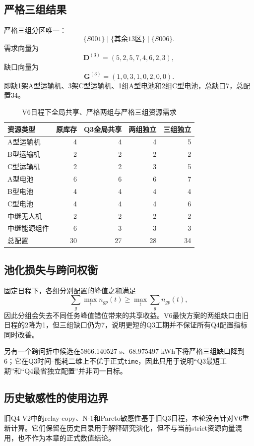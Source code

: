 \documentclass[UTF8,a4paper,12pt]{ctexart}
\begin{document}
\subsection{严格三组结果}

严格三组分区唯一：
\[
\boxed{\{S001\}\mid\{\text{其余13区}\}\mid\{S006\}}.
\]
需求向量为
\[
\mathbf D^{(3)}=(5,2,5,7,4,6,2,3),
\]
缺口向量为
\[
\boxed{\mathbf G^{(3)}=(1,0,3,1,0,2,0,0)}.
\]
即缺1架A型运输机、3架C型运输机、1组A型电池和2组C型电池，总缺口7，总配置34。

\begin{table}[H]
\centering
\caption{V6日程下全局共享、严格两组与严格三组资源需求}
\begin{tabular}{lrrrr}
\toprule
资源类型 & 原库存 & Q3全局共享 & 两组独立 & 三组独立\\
\midrule
A型运输机 & 4 & 4 & 4 & 5\\
B型运输机 & 2 & 2 & 2 & 2\\
C型运输机 & 2 & 2 & 3 & 5\\
A型电池 & 6 & 6 & 6 & 7\\
B型电池 & 4 & 4 & 4 & 4\\
C型电池 & 4 & 4 & 4 & 6\\
中继无人机 & 2 & 2 & 2 & 2\\
中继能源组件 & 6 & 3 & 3 & 3\\
\midrule
总配置 & 30 & 27 & 28 & 34\\
\bottomrule
\end{tabular}
\end{table}

\subsection{池化损失与跨问权衡}

固定日程下，各组分别配置的峰值之和满足
\[
\sum_g\max_t n_{gp}(t)\ge \max_t\sum_g n_{gp}(t),
\]
因此分组会失去不同任务峰值错位带来的共享收益。V6最快方案的两组缺口由旧日程的2降为1，但三组缺口仍为7，说明更短的Q3工期并不保证所有Q4配置指标同时改善。

另有一个跨问折中候选在5866.140527 s、68.975497 kWh下将严格三组缺口降到6；它在Q3时间--能耗二维上不优于正式\texttt{time}，因此只用于说明“Q3最短工期”和“Q4最省独立配置”并非同一目标。

\subsection{历史敏感性的使用边界}

旧Q4 V2中的relay-copy、N-1和Pareto敏感性基于旧Q3日程，本轮没有针对V6重新计算。它们保留在历史目录用于解释研究演化，但不与当前strict资源向量混用，也不作为本章的正式数值结论。
\end{document}
